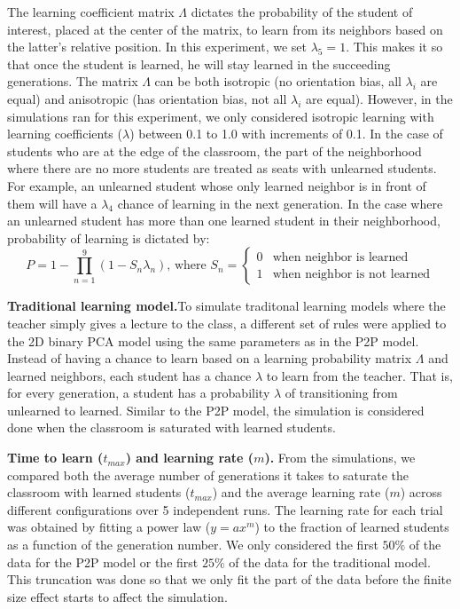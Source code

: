 \documentclass[10pt,a4paper,twoside]{article}
\begin{document}
\noindent The learning coefficient matrix $\Lambda$ dictates the probability of the student of interest, placed at the center of the matrix, to learn from its neighbors based on the latter's relative position. In this experiment, we set $\lambda_5 = 1$. This makes it so that once the student is learned, he will stay learned in the succeeding generations. The matrix $\Lambda$ can be both isotropic (no orientation bias, all $\lambda_i$ are equal) and anisotropic (has orientation bias, not all $\lambda_i$ are equal). However, in the simulations ran for this experiment, we only considered isotropic learning with learning coefficients ($\lambda$) between 0.1 to 1.0 with increments of 0.1.  In the case of students who are at the edge of the classroom, the part of the neighborhood where there are no more students are treated as seats with unlearned students. For example, an unlearned student whose only learned neighbor is in front of them will have a $\lambda_4$ chance of learning in the next generation. In the case where an unlearned student has more than one learned student in their neighborhood, probability of learning is dictated by:
\begin{equation}
  P = 1 - \prod_{n=1}^{9}{(1-S_n\lambda_n)}
  \text{, where } S_n=
  \begin{cases}
    0 & \text{when neighbor is learned}\\
    1 & \text{when neighbor is not learned}
  \end{cases}
  \label{eq:learning probability}
\end{equation}


\noindent \textbf{Traditional learning model.}To simulate traditonal learning models where the teacher simply gives a lecture to the class, a different set of rules were applied to the 2D binary PCA model using the same parameters as in the P2P model. Instead of having a chance to learn based on a learning probability matrix $\Lambda$ and learned neighbors, each student has a chance $\lambda$ to learn from the teacher. That is, for every generation, a student has a probability $\lambda$ of transitioning from unlearned to learned. Similar to the P2P model, the simulation is considered done when the classroom is saturated with learned students.

\noindent \textbf{Time to learn ($t_{max}$) and learning rate ($m$).} From the simulations, we compared both the average number of generations it takes to saturate the classroom with learned students ($t_{max}$) and the average learning rate ($m$) across different configurations over 5 independent runs. The learning rate for each trial was obtained by fitting a power law ($y = ax^m$) to the fraction of learned students as a function of the generation number. We only considered the first $50\%$ of the data for the P2P model or the first $25\%$ of the data for the traditional model. This truncation was done so that we only fit the part of the data before the finite size effect starts to affect the simulation. %
\end{document}
